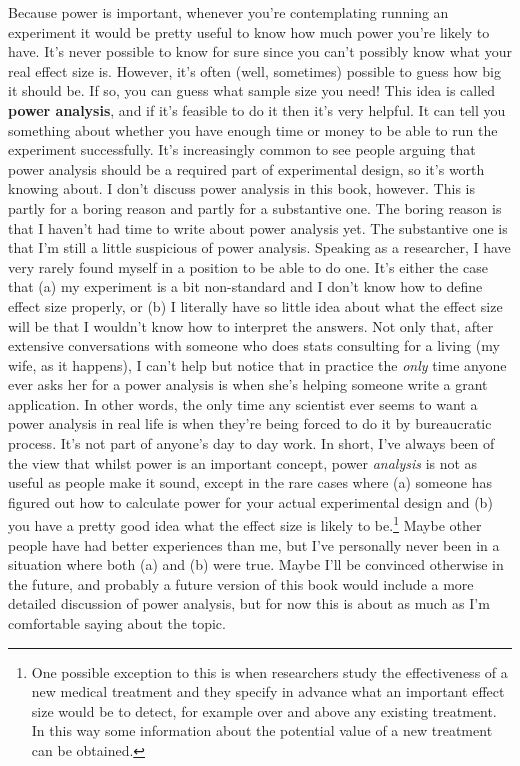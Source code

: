 \documentclass[
]{book}
\begin{document}
Because power is important, whenever you're contemplating running an experiment it would be pretty useful to know how much power you're likely to have. It's never possible to know for sure since you can't possibly know what your real effect size is. However, it's often (well, sometimes) possible to guess how big it should be. If so, you can guess what sample size you need! This idea is called {\textbf{power analysis}}, and if it's feasible to do it then it's very helpful. It can tell you something about whether you have enough time or money to be able to run the experiment successfully. It's increasingly common to see people arguing that power analysis should be a required part of experimental design, so it's worth knowing about. I don't discuss power analysis in this book, however. This is partly for a boring reason and partly for a substantive one. The boring reason is that I haven't had time to write about power analysis yet. The substantive one is that I'm still a little suspicious of power analysis. Speaking as a researcher, I have very rarely found myself in a position to be able to do one. It's either the case that (a) my experiment is a bit non-standard and I don't know how to define effect size properly, or (b) I literally have so little idea about what the effect size will be that I wouldn't know how to interpret the answers. Not only that, after extensive conversations with someone who does stats consulting for a living (my wife, as it happens), I can't help but notice that in practice the \emph{only} time anyone ever asks her for a power analysis is when she's helping someone write a grant application. In other words, the only time any scientist ever seems to want a power analysis in real life is when they're being forced to do it by bureaucratic process. It's not part of anyone's day to day work. In short, I've always been of the view that whilst power is an important concept, power \emph{analysis} is not as useful as people make it sound, except in the rare cases where (a) someone has figured out how to calculate power for your actual experimental design and (b) you have a pretty good idea what the effect size is likely to be.\footnote{One possible exception to this is when researchers study the effectiveness of a new medical treatment and they specify in advance what an important effect size would be to detect, for example over and above any existing treatment. In this way some information about the potential value of a new treatment can be obtained.} Maybe other people have had better experiences than me, but I've personally never been in a situation where both (a) and (b) were true. Maybe I'll be convinced otherwise in the future, and probably a future version of this book would include a more detailed discussion of power analysis, but for now this is about as much as I'm comfortable saying about the topic.
\end{document}
